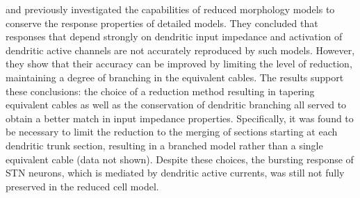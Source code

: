 \cite{hendrickson_capabilities_2011} and \cite{elbasiouny_development_2014}
previously investigated the capabilities of reduced morphology models to conserve the
response properties of detailed models. They concluded that responses that depend
strongly on  dendritic input impedance and activation of dendritic active channels are not
accurately reproduced by such models. However, they show that their accuracy can be improved by
limiting the level of reduction, maintaining a degree of branching in the equivalent cables.
%
%
%
The results support these conclusions: the choice of a reduction method resulting
in tapering equivalent cables as well as the conservation of dendritic branching
all served to obtain a better match in input impedance properties.
Specifically, it was found to be necessary to limit the reduction to the merging of sections
starting at each dendritic trunk section, resulting in a branched model rather than
a single equivalent cable (data not shown). Despite these choices, the bursting
response of STN neurons, which is mediated by dendritic active currents, was still
not fully preserved in the reduced cell model.

%
%
